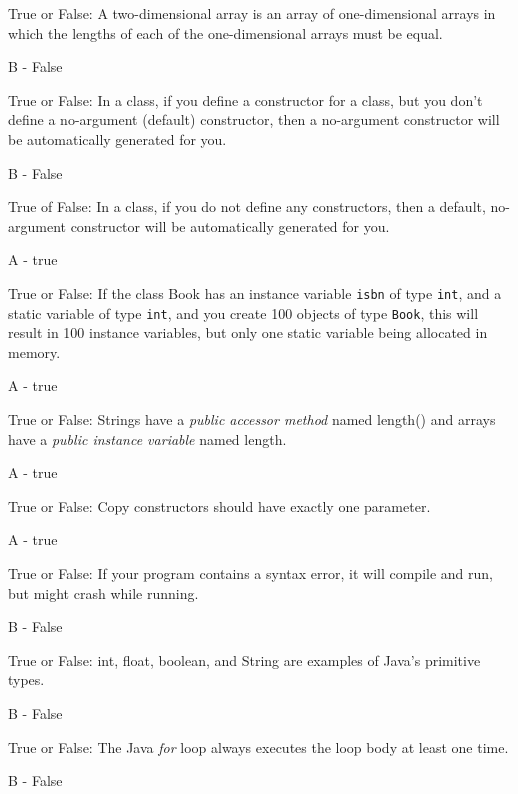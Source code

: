 \documentclass[11pt,answers]{exam}
\begin{document}
\begin{questions}
\question[1] True or False:   A two-dimensional array is an array of one-dimensional arrays in which the lengths of each of the one-dimensional arrays must be equal.
\begin{solution} B - False \end{solution}

\question[1] True or False:  In a class, if you define a constructor for a class, but you don't define a no-argument (default) constructor, then a no-argument constructor will be automatically generated for you.
\begin{solution} B - False \end{solution}

\question[1] True of False:  In a class, if you do not define any constructors, then a default, no-argument constructor will be automatically generated for you.
\begin{solution} A - true \end{solution}

\question[1] True or False:  If the class Book has an instance variable {\tt isbn} of type {\tt int}, and a static variable of type {\tt int}, and you create 100 objects of type {\tt Book}, this will result in 100 instance variables, but only one static variable being allocated in memory.
\begin{solution} A - true \end{solution}

\question[1] True or False:  Strings have a {\it public accessor method} named length() and arrays have a {\it public instance variable} named length.
\begin{solution} A - true \end{solution}

\question[1] True or False:  Copy constructors should have exactly one parameter.
\begin{solution} A - true \end{solution}

\question[1] True or False:  If your program contains a syntax error, it will compile and run, but might crash while running.
\begin{solution} B - False \end{solution}

\question[1] True or False: int, float, boolean, and String are examples of Java's primitive types.
\begin{solution} B - False \end{solution}

\question[1] True or False: The Java {\it for} loop always executes the loop body at least one time.
\begin{solution} B - False \end{solution}


\end{questions}
\end{document}
